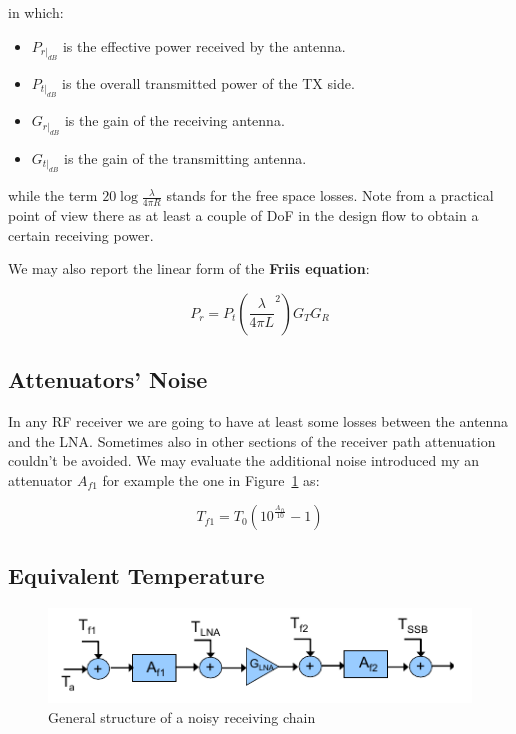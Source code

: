 in which:

\begin{itemize}
	\item $P_{r|_{dB}}$ is the effective power received by the antenna.
	\item $P_{t|_{dB}}$ is the overall transmitted power of the TX side.
	\item $G_{r|_{dB}}$ is the gain of the receiving antenna.
	\item $G_{t|_{dB}}$ is the gain of the transmitting antenna.
\end{itemize}

while the term $20\log{ \frac{\lambda}{4 \pi R} }$ stands for the free space losses.
Note from a practical point of view there as at least a couple of DoF in the design flow to obtain a certain receiving power.

We may also report the linear form of the \textbf{Friis equation}:

\begin{equation}
P_r = P_t  \left( \frac { \lambda } {4 \pi L}^2 \right) G_T G_R
\end{equation}




\subsection{Attenuators' Noise} %
\label{sub:noise_of_attenuators}

In any RF receiver we are going to have at least some losses between the antenna and the LNA. Sometimes also in other sections of the receiver path attenuation couldn't be avoided.
We may evaluate the additional noise introduced my an attenuator $A_{f1}$ for example the one in Figure~\ref{fig:Teq} as:

\begin{equation}
	T_{f1} = T_0 (10^{ \frac {A_{f1}} {10} }-1)
\end{equation}




\subsection{Equivalent Temperature} %
\label{sub:equivalent_temperature}

\begin{figure} [h!]
	\centering
	\includegraphics[scale=1]{Immagini/Teq}
	
	\caption{General structure of a noisy receiving chain}
	\label{fig:Teq}
\end{figure}


